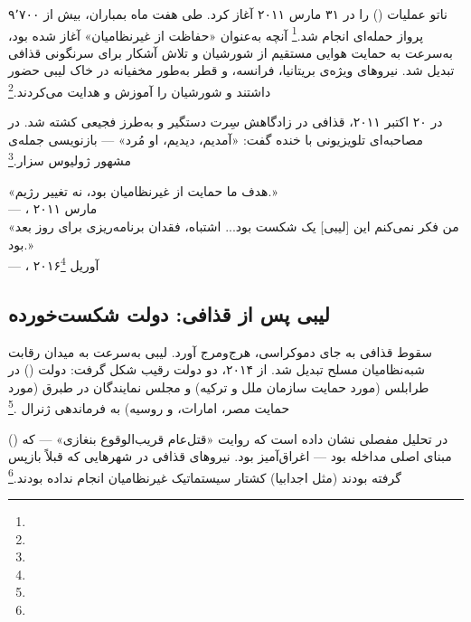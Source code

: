 ناتو عملیات  () را در ۳۱ مارس ۲۰۱۱ آغاز کرد. طی هفت ماه بمباران، بیش از ۹٬۷۰۰ پرواز حمله‌ای انجام شد.\footnote{} آنچه به‌عنوان «حفاظت از غیرنظامیان» آغاز شده بود، به‌سرعت به حمایت هوایی مستقیم از شورشیان و تلاش آشکار برای سرنگونی قذافی تبدیل شد. نیروهای ویژه‌ی بریتانیا، فرانسه، و قطر به‌طور مخفیانه در خاک لیبی حضور داشتند و شورشیان را آموزش و هدایت می‌کردند.\footnote{}

در ۲۰ اکتبر ۲۰۱۱، قذافی در زادگاهش سِرت دستگیر و به‌طرز فجیعی کشته شد.  در مصاحبه‌ای تلویزیونی با خنده گفت: «آمدیم، دیدیم، او مُرد» — بازنویسی جمله‌ی مشهور ژولیوس سزار.\footnote{}

\begin{tcolorbox}[quotebox, title={نقل‌قول تاریخی}]
«هدف ما حمایت از غیرنظامیان بود، نه تغییر رژیم.»\\
— ، مارس ۲۰۱۱\\[6pt]
«من فکر نمی‌کنم این [لیبی] یک شکست بود... اشتباه، فقدان برنامه‌ریزی برای روز بعد بود.»\\
— ، آوریل ۲۰۱۶\footnote{}
\end{tcolorbox}

\subsection{لیبی پس از قذافی: دولت شکست‌خورده}
\label{subsec:ch10-libya-aftermath}

سقوط قذافی به جای دموکراسی، هرج‌ومرج آورد. لیبی به‌سرعت به میدان رقابت شبه‌نظامیان مسلح تبدیل شد. از ۲۰۱۴، دو دولت رقیب شکل گرفت: دولت  () در طرابلس (مورد حمایت سازمان ملل و ترکیه) و مجلس نمایندگان در طبرق (مورد حمایت مصر، امارات، و روسیه) به فرماندهی ژنرال .\footnote{}

 () در تحلیل مفصلی نشان داده است که روایت «قتل‌عام قریب‌الوقوع بنغازی» — که مبنای اصلی مداخله بود — اغراق‌آمیز بود. نیروهای قذافی در شهرهایی که قبلاً بازپس گرفته بودند (مثل اجدابیا) کشتار سیستماتیک غیرنظامیان انجام نداده بودند.\footnote{}

